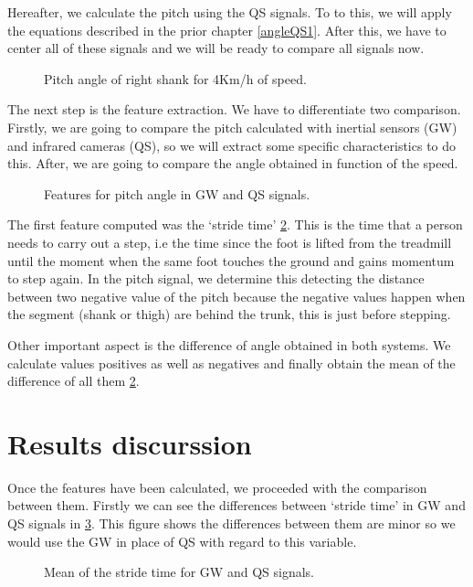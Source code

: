 Hereafter, we calculate the pitch using the QS signals. To to this, we will apply the equations described in the prior chapter \ref{angleQS1}.
After this, we have to center all of these signals and we will be ready to compare all signals now.

\begin{figure}[H]
	\centering
	\caption{Pitch angle of right shank for 4Km/h of speed.}
	\label{fig:signalGWQS}
\end{figure}

The next step is the feature extraction. We have to differentiate two comparison. Firstly, we are going to compare the pitch calculated with inertial sensors (GW) and infrared cameras (QS), so we will extract some specific characteristics to do this. After, we are going to compare the angle obtained in function of the speed.
\begin{figure}[H]
	\centering
	\caption{Features for pitch angle in GW and QS signals.}
	\label{fig:featuresGWQS}
\end{figure}
The first feature computed was the ‘stride time’ \ref{fig:featuresGWQS}. This is the time that a person needs to carry out a step, i.e the time since the foot is lifted from the treadmill until the moment when the same foot touches the ground and gains momentum to step again. In the pitch signal, we determine this detecting the distance between two negative value of the pitch because the negative values happen when the segment (shank or thigh) are behind the trunk, this is just before stepping.

Other important aspect is the difference of angle obtained in both systems. We calculate values positives as well as negatives and finally obtain the mean of the difference of all them \ref{fig:featuresGWQS}.


\section{Results discurssion}
Once the features have been calculated, we proceeded with the comparison between them. Firstly we can see the differences between ‘stride time’ in GW and QS signals in \ref{fig:mean_stride_time}. This figure shows the differences between them are minor so we would use the GW in place of QS with regard to this variable.

\begin{figure}[H]
	\centering
	\caption{Mean of the stride time for GW and QS signals.}
	\label{fig:mean_stride_time}
\end{figure}

